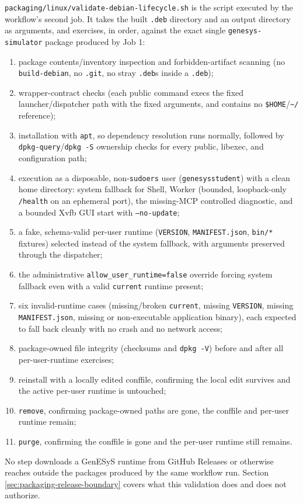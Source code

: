 \texttt{packaging/linux/validate-debian-lifecycle.sh} is the script executed
by the workflow's second job. It takes the built \texttt{.deb} directory and
an output directory as arguments, and exercises, in order, against the exact
single \texttt{genesys-simulator} package produced by Job 1:
\begin{enumerate}
\item package contents/inventory inspection and forbidden-artifact scanning
  (no \texttt{build-debian}, no \texttt{.git}, no stray \texttt{.deb}s inside
  a \texttt{.deb});
\item wrapper-contract checks (each public command execs the fixed
  launcher/dispatcher path with the fixed arguments, and contains no
  \texttt{\$HOME}/\texttt{\textasciitilde/} reference);
\item installation with \texttt{apt}, so dependency resolution runs
  normally, followed by \texttt{dpkg-query}/\texttt{dpkg -S} ownership checks
  for every public, libexec, and configuration path;
\item execution as a disposable, non-\texttt{sudoers} user
  (\texttt{genesysstudent}) with a clean home directory: system fallback for
  Shell, Worker (bounded, loopback-only \texttt{/health} on an ephemeral
  port), the missing-MCP controlled diagnostic, and a bounded Xvfb GUI start
  with \texttt{--no-update};
\item a fake, schema-valid per-user runtime (\texttt{VERSION},
  \texttt{MANIFEST.json}, \texttt{bin/*} fixtures) selected instead of the
  system fallback, with arguments preserved through the dispatcher;
\item the administrative \texttt{allow\_user\_runtime=false} override forcing
  system fallback even with a valid \texttt{current} runtime present;
\item six invalid-runtime cases (missing/broken \texttt{current}, missing
  \texttt{VERSION}, missing \texttt{MANIFEST.json}, missing or
  non-executable application binary), each expected to fall back cleanly with
  no crash and no network access;
\item package-owned file integrity (checksums and \texttt{dpkg -V}) before and
  after all per-user-runtime exercises;
\item reinstall with a locally edited conffile, confirming the local edit
  survives and the active per-user runtime is untouched;
\item \texttt{remove}, confirming package-owned paths are gone, the conffile
  and per-user runtime remain;
\item \texttt{purge}, confirming the conffile is gone and the per-user
  runtime still remains.
\end{enumerate}
No step downloads a GenESyS runtime from GitHub Releases or otherwise reaches
outside the packages produced by the same workflow run. Section
\ref{sec:packaging-release-boundary} covers what this validation does and does
not authorize.

